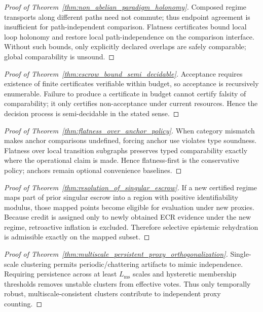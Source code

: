 \documentclass[11pt]{article}
\theoremstyle{definition}
\theoremstyle{plain}
\newcommand{\Lms}{L_{\mathrm{ms}}}
\begin{document}
\begin{proof}[Proof of Theorem~\ref{thm:non_abelian_paradigm_holonomy}]
Composed regime transports along different paths need not commute; thus endpoint agreement is insufficient for path-independent comparison.
Flatness certificates bound local loop holonomy and restore local path-independence on the comparison interface.
Without such bounds, only explicitly declared overlaps are safely comparable; global comparability is unsound.
\end{proof}

\begin{proof}[Proof of Theorem~\ref{thm:escrow_bound_semi_decidable}]
Acceptance requires existence of finite certificates verifiable within budget, so acceptance is recursively enumerable.
Failure to produce a certificate in budget cannot certify falsity of comparability; it only certifies non-acceptance under current resources.
Hence the decision process is semi-decidable in the stated sense.
\end{proof}

\begin{proof}[Proof of Theorem~\ref{thm:flatness_over_anchor_policy}]
When category mismatch makes anchor comparisons undefined, forcing anchor use violates type soundness.
Flatness over local transition subgraphs preserves typed comparability exactly where the operational claim is made.
Hence flatness-first is the conservative policy; anchors remain optional convenience baselines.
\end{proof}

\begin{proof}[Proof of Theorem~\ref{thm:resolution_of_singular_escrow}]
If a new certified regime maps part of prior singular escrow into a region with positive identifiability modulus, those mapped points become eligible for evaluation under new proxies.
Because credit is assigned only to newly obtained ECR evidence under the new regime, retroactive inflation is excluded.
Therefore selective epistemic rehydration is admissible exactly on the mapped subset.
\end{proof}

\begin{proof}[Proof of Theorem~\ref{thm:multiscale_persistent_proxy_orthogonalization}]
Single-scale clustering permits periodic/chattering artifacts to mimic independence.
Requiring persistence across at least $\Lms$ scales and hysteretic membership thresholds removes unstable clusters from effective votes.
Thus only temporally robust, multiscale-consistent clusters contribute to independent proxy counting.
\end{proof}
\end{document}
